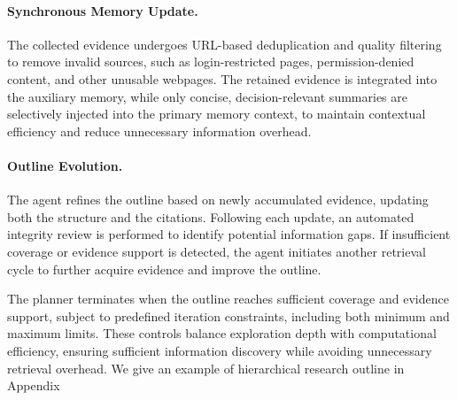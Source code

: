\documentclass{huawei}
\begin{document}
\paragraph{Synchronous Memory Update.} 
The collected evidence undergoes URL-based deduplication and quality filtering to remove invalid sources, such as login-restricted pages, permission-denied content, and other unusable webpages. The retained evidence is integrated into the auxiliary memory, while only concise, decision-relevant summaries are selectively injected into the primary memory context, to maintain contextual efficiency and reduce unnecessary information overhead.

\paragraph{Outline Evolution.}
The agent refines the outline based on newly accumulated evidence, updating both the structure and the citations. Following each update, an automated integrity review is performed to identify potential information gaps. If insufficient coverage or evidence support is detected, the agent initiates another retrieval cycle to further acquire evidence and improve the outline.

The planner terminates when the outline reaches sufficient coverage and evidence support, subject to predefined iteration constraints, including both minimum and maximum limits. These controls balance exploration depth with computational efficiency, ensuring sufficient information discovery while avoiding unnecessary retrieval overhead.
We give an example of hierarchical research outline in Appendix 


\end{document}
